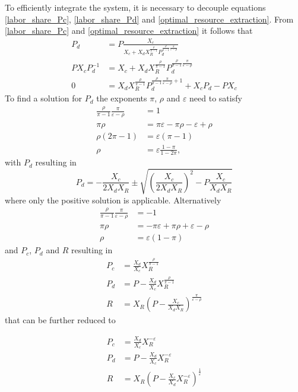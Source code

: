 To efficiently integrate the system, it is necessary to decouple equations \eqref{labor_share_Pc}, \eqref{labor_share_Pd} and \eqref{optimal_resource_extraction}.
From \eqref{labor_share_Pc} and \eqref{optimal_resource_extraction} it follows that
\begin{align}
	P_d &= P\frac{X_c}{X_c + X_d X_R^{\frac{\rho}{\pi-1}}P_d^{\frac{\rho}{\pi-1}\frac{\pi}{\varepsilon-\rho}}} \\
	P X_c P_d^{-1} &= X_c + X_d X_R^{\frac{\rho}{\pi-1}}P_d^{\frac{\rho}{\pi-1}\frac{\pi}{\varepsilon-\rho}} \\
	0 &= X_d X_R^{\frac{\rho}{\pi-1}}P_d^{\frac{\rho}{\pi-1}\frac{\pi}{\varepsilon-\rho}+1} + X_c P_d - P X_c
\end{align}
To find a solution for $P_d$ the exponents $\pi$, $\rho$ and $\varepsilon$ need to satisfy
\begin{align}
	\frac{\rho}{\pi-1}\frac{\pi}{\varepsilon-\rho} &= 1 \\
	\pi \rho &= \pi\varepsilon - \pi\rho - \varepsilon + \rho \\
	\rho ( 2\pi-1) &= \varepsilon (\pi-1) \\
	\rho &= \varepsilon \frac{1-\pi}{1-2\pi},
\end{align}
with $P_d$ resulting in 
\begin{equation}
	P_d = -\frac{X_c}{2X_d X_R} \pm \sqrt{\left( \frac{X_c}{2 X_d X_R} \right)^{2}-P\frac{X_c}{X_d X_R}}
\end{equation}
where only the positive solution is applicable.
Alternatively
\begin{align}
	\frac{\rho}{\pi-1}\frac{\pi}{\varepsilon-\rho} &= -1 \\
	\pi \rho &= -\pi\varepsilon + \pi\rho + \varepsilon - \rho \\
	\rho &= \varepsilon(1-\pi)
\end{align}
and $P_c$, $P_d$ and $R$ resulting in
\begin{align}
	P_c &= \frac{X_d }{X_c}X_R ^{\frac{\rho}{\pi-1}} \\
	P_d &= P - \frac{X_d }{X_c}X_R ^{\frac{\rho}{\pi-1}} \\
	R &= X_R \left( P-\frac{X_c}{X_d X_R} \right)^{\frac{\pi}{\varepsilon-\rho}}
	\label{input_share_solution_II}
\end{align}
that can be further reduced to

\begin{align}
	P_c &= \frac{X_d }{X_c}X_R ^{-\varepsilon} \\
	P_d &= P - \frac{X_d }{X_c}X_R ^{-\varepsilon} \\
	R &= X_R \left( P-\frac{X_c}{X_d} X_R^{-\varepsilon} \right)^{\frac{1}{\varepsilon}}
	\label{input_share_solution_IIb}
\end{align}

